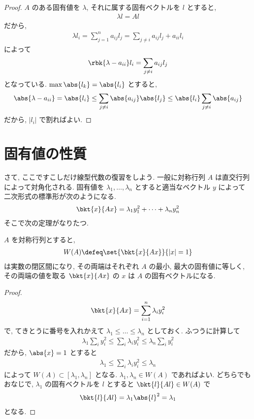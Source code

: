 \documentclass[openany, a4paper, oneside]{jsbook}
\begin{document}
\begin{proof}
$A$ のある固有値を $\lambda$, それに属する固有ベクトルを
$l$ とすると,
\begin{align}
 \lambda l
 =
 Al
\end{align}
だから,
\begin{align}
 \lambda l_i
 =
 \sum_{j=1}^n
 a_{ij} l_j
 =
 \sum_{j \neq i} a_{ij} l_j  + a_{ii} l_i
\end{align}
によって
\begin{align}
 \rbk{\lambda - a_{ii}} l_i
 =
 \sum_{j \neq i} a_{ij} l_j
\end{align}
となっている.
$\max \abs{l_k} = \abs{l_i}$ とすると,
\begin{align}
 \abs{\lambda - a_{ii}}
 =
 \abs{l_i}
 \le
 \sum_{j \neq i} \abs{a_{ij}} \abs{l_j}
 \le
 \abs{l_i} \sum_{j \neq i} \abs{a_{ij}}
\end{align}
だから, $|l_i|$ で割ればよい.
\end{proof}
\section{固有値の性質}

さて, ここですこしだけ線型代数の復習をしよう.
一般に対称行列 $A$ は直交行列によって対角化される.
固有値を $\lambda_1, \dots, \lambda_n$ とすると適当なベクトル $y$ によって二次形式の標準形が次のようになる.
\begin{align}
 \bkt{x}{Ax}
 =
 \lambda_1 y_1^2 + \dots + \lambda_n y_n^2
\end{align}
そこで次の定理がなりたつ.
\begin{thm}
 $A$ を対称行列とすると,
 \begin{align}
  W(A)
  \defeq
  \set{\bkt{x}{Ax}}{|x| = 1}
 \end{align}
 は実数の閉区間になり, その両端はそれぞれ $A$ の最小, 最大の固有値に等しく,
 その両端の値を取る $\bkt{x}{Ax}$ の $x$ は $A$ の固有ベクトルになる.
\end{thm}
\begin{proof}
\begin{align}
 \bkt{x}{Ax}
 =
 \sum_{i=1}^n \lambda_i y_i^2
\end{align}
で, てきとうに番号を入れかえて $\lambda_1 \le \dots \le \lambda_n$ としておく.
ふつうに計算して
\begin{align}
 \lambda_1 \sum_i y_i^2
 \le
 \sum_i \lambda_i y_i^2
 \le
 \lambda_n \sum_i y_i^2
\end{align}
だから, $\abs{x}=1$ とすると
\begin{align}
 \lambda_1
 \le
 \sum_i \lambda_i y_i^2
 \le
 \lambda_n
\end{align}
によって $W(A) \subset [\lambda_1, \lambda_n]$
となる.
$\lambda_1, \lambda_n \in W(A)$ であればよい.
どちらでもおなじで, $\lambda_1$ の固有ベクトルを $l$ とすると $\bkt{l}{Al} \in W(A)$ で
\begin{align}
 \bkt{l}{Al}
 =
 \lambda_1 \abs{l}^2
 =
 \lambda_1
\end{align}
となる.
\end{proof}
\end{document}
